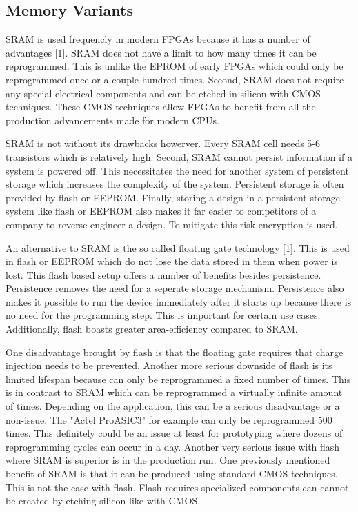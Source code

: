 \documentclass{article}
\begin{document}
    \subsection{Memory Variants}

    SRAM is used frequencly in modern FPGAs because it has a number of advantages [1]. SRAM
    does not have a limit to how many times it can be reprogrammed. This is unlike the
    EPROM of early FPGAs which could only be reprogrammed once or a couple hundred times.
    Second, SRAM does not require any special electrical components and can be etched
    in silicon with CMOS techniques. These CMOS techniques allow FPGAs to benefit from
    all the production advancements made for modern CPUs.

    SRAM is not without its drawbacks howerver. Every SRAM cell needs 5-6 transistors
    which is relatively high. Second, SRAM cannot persist information if a system is powered
    off. This necessitates the need for another system of persistent storage which increases
    the complexity of the system. Persistent storage is often provided by flash or EEPROM.
    Finally, storing a design in a persistent storage system like flash or EEPROM also
    makes it far easier to competitors of a company to reverse engineer a design.
    To mitigate this risk encryption is used.

    An alternative to SRAM is the so called floating gate technology [1]. This is used
    in flash or EEPROM which do not lose the data stored in them when power is lost.
    This flash based setup offers a number of benefits besides persistence.
    Persistence removes the need for a seperate storage mechanism. Persistence also
    makes it possible to run the device immediately after it starts up because there
    is no need for the programming step. This is important for certain use cases.
    Additionally, flash boasts greater area-efficiency compared to SRAM.

    One disadvantage brought by flash is that the floating gate requires that
    charge injection needs to be prevented. Another more serious downside of flash
    is its limited lifespan because can only be reprogrammed a fixed number of times.
    This is in contrast to SRAM which can be reprogrammed a virtually infinite amount of times.
    Depending on the application, this can be a serious disadvantage or a non-issue.
    The "Actel ProASIC3" for example can only be reprogrammed 500 times.
    This definitely could be an issue at least for prototyping where dozens of reprogramming
    cycles can occur in a day. Another very serious issue with flash where SRAM
    is superior is in the production run. One previously mentioned benefit of SRAM
    is that it can be produced using standard CMOS techniques. This is not the case with
    flash. Flash requires specialized components can cannot be created by etching
    silicon like with CMOS.
\end{document}
